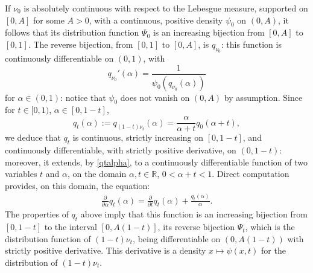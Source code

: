\documentclass[11pt]{amsart}
\begin{document}
If $\nu_0$ is absolutely continuous with respect to the Lebesgue measure, supported on $[0,A]$ for some $A > 0$, with a continuous, positive density $\psi_0$ 
on $(0, A)$, it follows that its distribution function
$\Psi_0$ is an increasing bijection from $[0,A]$
to $[0,1]$. The reverse bijection, from $[0,1]$ to $[0,A]$, is $q_{\nu_0}$: this function is continuously differentiable on $(0,1)$,
with 
$$q_{\nu_0}'(\alpha) = \frac{1}{ \psi_0(q_{\nu_0}(\alpha))}$$
for $\alpha \in (0,1)$: notice that $\psi_0$ does not vanish on $(0,A)$ by assumption. 
Since for $t \in [0,1)$, $\alpha \in [0, 1-t]$, 
\begin{equation} q_t (\alpha) := q_{(1-t)\nu_t} (\alpha) = \frac{\alpha}{\alpha+t} q_0 (\alpha + t), \label{qtalpha}
\end{equation}
we deduce that $q_{t}$ is continuous, 
strictly increasing  on $[0, 1-t]$, and continuously differentiable, with strictly positive derivative, on $(0, 1-t)$: moreover, it extends, by \eqref{qtalpha}, to a continuously differentiable 
function of two variables $t$ and $\alpha$, on the domain $\alpha, t \in \mathbb{R}$, $0 < \alpha + t < 1$. 
Direct 
computation provides, on this domain, the equation:
\begin{align}\label{e:inv_Psit}
\frac{\partial}{\partial \alpha} 
q_{t} (\alpha)
= \frac{\partial}{\partial t} 
q_{t} (\alpha) + \frac{q_t (\alpha) }{\alpha}.  
\end{align}
The properties of $q_{t}$ above imply that this function is an increasing bijection 
from $[0, 1-t]$ to the interval $[0, A(1-t)]$, 
 its reverse bijection $\Psi_t$, which is the distribution function of $(1-t) \nu_t$, 
being differentiable on $(0, A(1-t))$ with strictly positive derivative. This derivative 
is a density $x \mapsto \psi(x,t)$ for the 
distribution of $(1-t) \nu_t$. 
\end{document}
